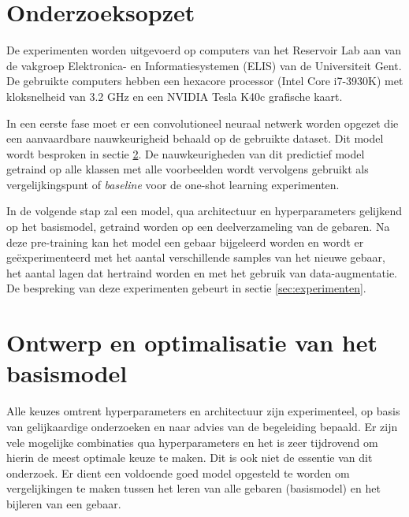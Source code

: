 \section{Onderzoeksopzet}

De experimenten worden uitgevoerd op computers van het Reservoir Lab aan van de vakgroep Elektronica- en Informatiesystemen (ELIS) van de Universiteit Gent. De gebruikte computers hebben een hexacore processor (Intel Core i7-3930K) met kloksnelheid van 3.2 GHz en een NVIDIA Tesla K40c grafische kaart.

\npar In een eerste fase moet er een convolutioneel neuraal netwerk worden opgezet die een aanvaardbare nauwkeurigheid behaald op de gebruikte dataset. Dit model wordt besproken in sectie \ref{sec:basismodel}. De nauwkeurigheden van dit predictief model getraind op alle klassen met alle voorbeelden wordt vervolgens gebruikt als vergelijkingspunt of \textit{baseline} voor de one-shot learning experimenten.

\npar In de volgende stap zal een model, qua architectuur en hyperparameters gelijkend op het basismodel, getraind worden op een deelverzameling van de gebaren. Na deze pre-training kan het model een gebaar bijgeleerd worden en wordt er ge\"experimenteerd met het aantal verschillende samples van het nieuwe gebaar, het aantal lagen dat hertraind worden en met het gebruik van data-augmentatie. De bespreking van deze experimenten gebeurt in sectie \ref{sec:experimenten}.

\section{Ontwerp en optimalisatie van het basismodel}\label{sec:basismodel}
Alle keuzes omtrent hyperparameters en architectuur zijn experimenteel, op basis van gelijkaardige onderzoeken en naar advies van de begeleiding bepaald. Er zijn vele mogelijke combinaties qua hyperparameters en het is zeer tijdrovend om hierin de meest optimale keuze te maken. Dit is ook niet de essentie van dit onderzoek. Er dient een voldoende goed model opgesteld te worden om vergelijkingen te maken tussen het leren van alle gebaren (basismodel) en het bijleren van een gebaar. 

